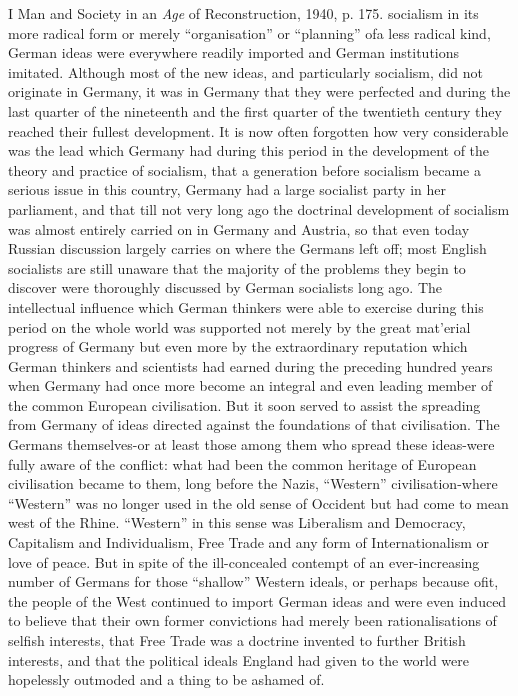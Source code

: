 \documentclass[11pt,openany]{book}
\begin{document}
I Man and Society in an \emph{Age} of Reconstruction, 1940, p. 175. socialism in its more radical form or merely ``organisation'' or ``planning'' ofa less radical kind, German ideas were everywhere readily imported and German institutions imitated. Although most of the new ideas, and particularly socialism, did not originate in Germany, it was in Germany that they were perfected and during the last quarter of the nineteenth and the first quarter of the twentieth century they reached their fullest development. It is now often forgotten how very considerable was the lead which Germany had during this period in the development of the theory and practice of socialism, that a generation before socialism became a serious issue in this country, Germany had a large socialist party in her parliament, and that till not very long ago the doctrinal development of socialism was almost entirely carried on in Germany and Austria, so that even today Russian discussion largely carries on where the Germans left off; most English socialists are still unaware that the majority of the problems they begin to discover were thoroughly discussed by German socialists long ago. The intellectual influence which German thinkers were able to exercise during this period on the whole world was supported not merely by the great mat'erial progress of Germany but even more by the extraordinary reputation which German thinkers and scientists had earned during the preceding hundred years when Germany had once more become an integral and even leading member of the common European civilisation. But it soon served to assist the spreading from Germany of ideas directed against the foundations of that civilisation. The Germans themselves-or at least those among them who spread these ideas-were fully aware of the conflict: what had been the common heritage of European civilisation became to them, long before the Nazis, ``Western'' civilisation-where ``Western'' was no longer used in the old sense of Occident but had come to mean west of the Rhine. ``Western'' in this sense was Liberalism and Democracy, Capitalism and Individualism, Free Trade and any form of Internationalism or love of peace. But in spite of the ill-concealed contempt of an ever-increasing number of Germans for those ``shallow'' Western ideals, or perhaps because ofit, the people of the West continued to import German ideas and were even induced to believe that their own former convictions had merely been rationalisations of selfish interests, that Free Trade was a doctrine invented to further British interests, and that the political ideals England had given to the world were hopelessly outmoded and a thing to be ashamed of.
\end{document}
